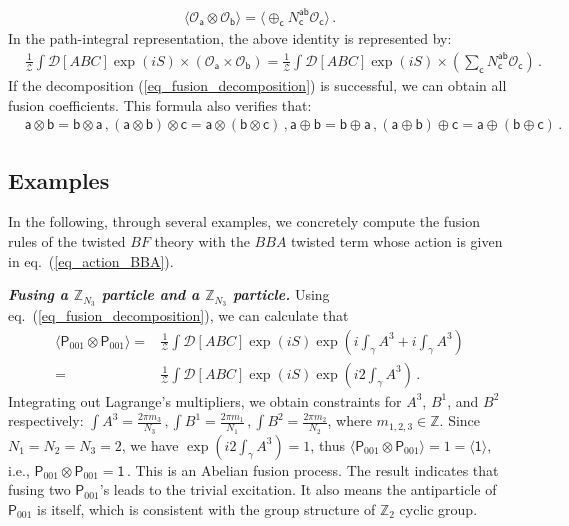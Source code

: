 \documentclass[11pt,nofootinbib,preprint]{revtex4-1}
\begin{document}
\begin{align}
	\langle \mathcal{O}_\mathsf{a}\otimes \mathcal{O}_\mathsf{b} \rangle=\langle \oplus _{\mathsf{c}}N_{\mathsf{c}}^{\mathsf{a}\mathsf{b}}\mathcal{O}_\mathsf{c} \rangle\,.
\end{align}
In the path-integral representation, the above identity is represented by:   
\begin{align}
	 &\frac{1}{\mathcal{Z}}\int\mathcal{D} \left[ ABC\right] \exp \left( iS \right) \times \left( \mathcal{O} _{\mathsf{a}}\times \mathcal{O} _{\mathsf{b}} \right) =\frac{1}{\mathcal{Z}}\int \mathcal{D} \left[ ABC\right] \exp \left( iS \right) \times \left( \sum_\mathsf{c}{N_{\mathsf{c}}^{\mathsf{a}\mathsf{b}}}\mathcal{O} _{\mathsf{c}} \right)  \,.
	 	\label{eq_fusion_decomposition}
\end{align}
If the  decomposition (\ref{eq_fusion_decomposition}) is successful, we can obtain all fusion coefficients. This formula also verifies that: 
\begin{align}
	&\mathsf{a}\otimes \mathsf{b}=\mathsf{b}\otimes \mathsf{a}\,, \left(\mathsf{a}\otimes \mathsf{b}\right)\otimes \mathsf{c}=\mathsf{a}\otimes\left(\mathsf{b}\otimes \mathsf{c}\right)\,,\mathsf{a}\oplus \mathsf{b}=\mathsf{b}\oplus \mathsf{a}\,,\left(\mathsf{a}\oplus \mathsf{b}\right)\oplus \mathsf{c}=\mathsf{a}\oplus\left(\mathsf{b}\oplus \mathsf{c}\right)\,.
	\label{eq_fusion_algebra_rule}
\end{align} 
\subsection{Examples\label{ss31}}
In the following, through several examples, we  concretely compute the fusion rules of the twisted $BF$ theory with the $BBA$ twisted term whose action is given in eq.~(\ref{eq_action_BBA}).

\textbf{\textit{Fusing a $\mathbb{Z} _{N_3}$ particle and a $\mathbb{Z} _{N_3}$ particle.}}
Using eq.~(\ref{eq_fusion_decomposition}), we can calculate that
\begin{align}
	\langle \mathsf{P}_{001}\otimes \mathsf{P}_{001} \rangle 
	=&\frac{1}{\mathcal{Z}}\int{\mathcal{D} \left[ ABC   \right] \exp \left( iS \right) \exp \left( i\int_{\gamma}{A^3}+i\int_{\gamma}{A^3} \right) } \nonumber
	\\
	=&\frac{1}{\mathcal{Z}}\int{\mathcal{D} \left[ ABC   \right]  \exp \left( iS \right) \exp \left( i2\int_{\gamma}{A^3} \right) }  \,.
\end{align}
Integrating out Lagrange's multipliers, we obtain constraints for $A^3$, $B^1$, and $B^2$ respectively:
$\int{A^3}=\frac{2\pi m_3}{N_3}  \,,
\int{B^1}=\frac{2\pi m_1}{N_1}  \,,
\int{B^2}=\frac{2\pi m_2}{N_2} $, 
where $m_{1,2,3}\in\mathbb{Z}$. Since $N_1=N_2=N_3=2$, we have $\exp \left( i2\int_{\gamma}{A^3} \right) =1$, thus
$	\langle\mathsf{P}_{001}\otimes \mathsf{P}_{001} \rangle =1=\langle\mathsf{1} \rangle$,
i.e., 
$	\mathsf{P}_{001}\otimes \mathsf{P}_{001}=\mathsf{1}\,$.  This is an Abelian fusion process. The result indicates that fusing two $\mathsf{P}_{001}$'s leads to the trivial excitation. It also   means the antiparticle of $\mathsf{P}_{001}$ is itself, which is   consistent with the group structure of $\mathbb{Z}_2$ cyclic group.
\end{document}
